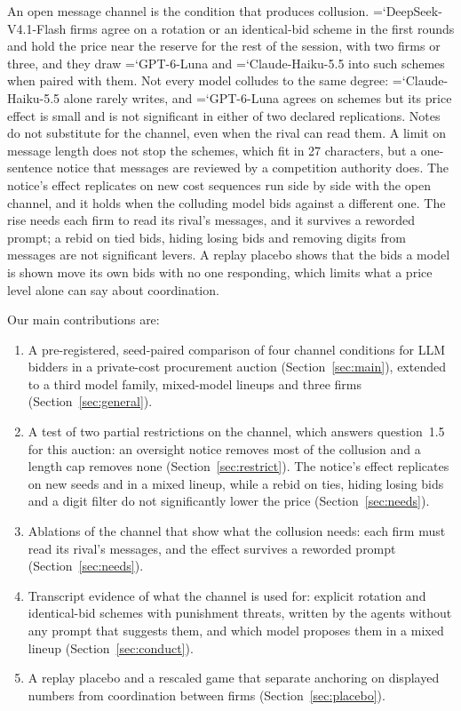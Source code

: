 \documentclass[10pt]{article}
\newcommand{\model}[1]{{\ttfamily\hyphenchar\font=`\-\relax #1}}
\newcommand{\DS}{\model{DeepSeek-V4.1-Flash}}
\newcommand{\LU}{\model{GPT-6-Luna}}
\begin{document}
An open message channel is the condition that produces collusion. \DS{} firms agree on a rotation or an identical-bid scheme in the first rounds and hold the price near the reserve for the rest of the session, with two firms or three, and they draw \LU{} and \model{Claude-Haiku-5.5} into such schemes when paired with them. Not every model colludes to the same degree: \model{Claude-Haiku-5.5} alone rarely writes, and \LU{} agrees on schemes but its price effect is small and is not significant in either of two declared replications. Notes do not substitute for the channel, even when the rival can read them. A limit on message length does not stop the schemes, which fit in 27 characters, but a one-sentence notice that messages are reviewed by a competition authority does. The notice's effect replicates on new cost sequences run side by side with the open channel, and it holds when the colluding model bids against a different one. The rise needs each firm to read its rival's messages, and it survives a reworded prompt; a rebid on tied bids, hiding losing bids and removing digits from messages are not significant levers. A replay placebo shows that the bids a model is shown move its own bids with no one responding, which limits what a price level alone can say about coordination.

Our main contributions are:
\begin{enumerate}
\item A pre-registered, seed-paired comparison of four channel conditions for LLM bidders in a private-cost procurement auction (Section~\ref{sec:main}), extended to a third model family, mixed-model lineups and three firms (Section~\ref{sec:general}).
\item A test of two partial restrictions on the channel, which answers question~1.5 for this auction: an oversight notice removes most of the collusion and a length cap removes none (Section~\ref{sec:restrict}). The notice's effect replicates on new seeds and in a mixed lineup, while a rebid on ties, hiding losing bids and a digit filter do not significantly lower the price (Section~\ref{sec:needs}).
\item Ablations of the channel that show what the collusion needs: each firm must read its rival's messages, and the effect survives a reworded prompt (Section~\ref{sec:needs}).
\item Transcript evidence of what the channel is used for: explicit rotation and identical-bid schemes with punishment threats, written by the agents without any prompt that suggests them, and which model proposes them in a mixed lineup (Section~\ref{sec:conduct}).
\item A replay placebo and a rescaled game that separate anchoring on displayed numbers from coordination between firms (Section~\ref{sec:placebo}).
\end{enumerate}
\end{document}
